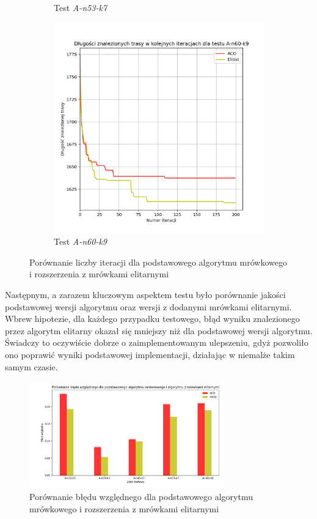 \documentclass[10pt]{article}
\begin{document}
\begin{figure}[H]
\begin{subfigure}[b]{0.4\textwidth}
         \caption{Test \textit{A-n53-k7}}
     \end{subfigure}
     \hfill
     \begin{subfigure}[b]{0.4\textwidth}
         \centering
         \includegraphics[width=\textwidth]{iterations_elitist_5.png}
         \caption{Test \textit{A-n60-k9}}
     \end{subfigure}
    \caption{Porównanie liczby iteracji dla podstawowego algorytmu mrówkowego i rozszerzenia z mrówkami elitarnymi}
    \label{fig:iterations_elitist}
\end{figure}

Następnym, a zarazem kluczowym aspektem testu było porównanie jakości podstawowej wersji algorytmu oraz wersji z dodanymi mrówkami elitarnymi. Wbrew hipotezie, dla każdego przypadku testowego, błąd wyniku znalezionego przez algorytm elitarny okazał się mniejszy niż dla podstawowej wersji algorytmu. Świadczy to oczywiście dobrze o zaimplementowanym ulepszeniu, gdyż pozwoliło ono poprawić wyniki podstawowej implementacji, działając w niemalże takim samym czasie.

\begin{figure}[H]
    \centering
    \includegraphics[width=0.75\textwidth]{errors_elitist.png}
    \caption{Porównanie błędu względnego dla podstawowego algorytmu mrówkowego i rozszerzenia z mrówkami elitarnymi}
    \label{fig:errors_elitist}
\end{figure}
\end{document}
